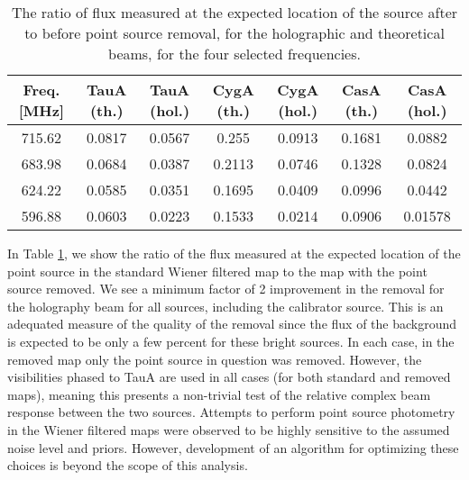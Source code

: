 \begin{table}[ht]
\begin{center}
\begin{tabular}{| c | c | c | c | c | c | c |}
\hline
Freq. [MHz] & TauA (th.) & TauA (hol.) & CygA (th.) & CygA (hol.) & CasA (th.) & CasA (hol.) \\ \hline
715.62  & 0.0817 & 0.0567  & 0.255  & 0.0913 & 0.1681 & 0.0882 \\ \hline
683.98 & 0.0684 & 0.0387 & 0.2113 & 0.0746 & 0.1328 &  0.0824 \\ \hline
624.22 & 0.0585 & 0.0351  & 0.1695 & 0.0409 & 0.0996 & 0.0442 \\ \hline
596.88 & 0.0603 & 0.0223 & 0.1533 & 0.0214 & 0.0906 & 0.01578 \\ \hline
\end{tabular}
\end{center}
\caption{The ratio of flux measured at the expected location of the source after to before point source removal, for the holographic and theoretical beams, for the four selected frequencies. \label{psremove_table}} 
\end{table}

In Table \ref{psremove_table}, we show the ratio of the flux measured at the expected location of the point source in the standard Wiener filtered map to the map with the point source removed. We see a minimum factor of 2 improvement in the removal for the holography beam for all sources, including the calibrator source. This is an adequated measure of the quality of the removal since the flux of the background is expected to be only a few percent for these bright sources. In each case, in the removed map only the point source in question was removed. However, the visibilities phased to TauA are used in all cases (for both standard and removed maps), meaning this presents a non-trivial test of the relative complex beam response between the two sources. Attempts to perform point source photometry in the Wiener filtered maps were observed to be highly sensitive to the assumed noise level and priors. However, development of an algorithm for optimizing these choices is beyond the scope of this analysis.

